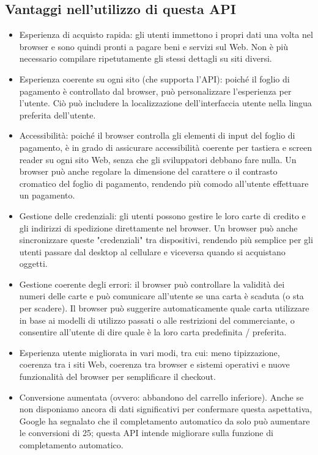 \documentclass[italian]{article}
\begin{document}
	\subsection{Vantaggi nell'utilizzo di questa API}
	\begin{itemize}
	\item Esperienza di acquisto rapida: gli utenti immettono i propri dati una volta nel browser e sono quindi pronti a pagare beni e servizi sul Web. Non è più necessario compilare ripetutamente gli stessi dettagli su siti diversi. 
	\item Esperienza coerente su ogni sito (che supporta l'API):  poiché il foglio di pagamento è controllato dal browser, può personalizzare l'esperienza per l'utente. Ciò può includere la localizzazione dell'interfaccia utente nella lingua preferita dell'utente.
	\item Accessibilità: poiché il browser controlla gli elementi di input del foglio di pagamento, è in grado di assicurare accessibilità coerente per tastiera e screen reader su ogni sito Web, senza che gli sviluppatori debbano fare nulla. Un browser può anche regolare la dimensione del carattere o il contrasto cromatico del foglio di pagamento, rendendo più comodo all'utente effettuare un pagamento. 
	\item Gestione delle credenziali: gli utenti possono gestire le loro carte di credito e gli indirizzi di spedizione direttamente nel browser. Un browser può anche sincronizzare queste "credenziali" tra dispositivi, rendendo più semplice per gli utenti passare dal desktop al cellulare e viceversa quando si acquistano oggetti.
	\item Gestione coerente degli errori: il browser può controllare la validità dei numeri delle carte e può comunicare all'utente se una carta è scaduta (o sta per scadere). Il browser può suggerire automaticamente quale carta utilizzare in base ai modelli di utilizzo passati o alle restrizioni del commerciante, o consentire all'utente di dire quale è la loro carta predefinita / preferita.
	\item Esperienza utente migliorata in vari modi, tra cui: meno tipizzazione, coerenza tra i siti Web, coerenza tra browser e sistemi operativi e nuove funzionalità del browser per semplificare il checkout.
	\item Conversione aumentata (ovvero: abbandono del carrello inferiore). Anche se non disponiamo ancora di dati significativi per confermare questa aspettativa, Google ha segnalato che il completamento automatico da solo può aumentare le conversioni di 25; questa API intende migliorare sulla funzione di completamento automatico.

\end{itemize}
\end{document}
